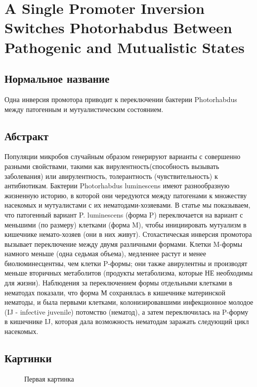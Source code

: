 \section{A Single Promoter Inversion Switches Photorhabdus Between Pathogenic and Mutualistic States}

\subsection{Нормальное название}

Одна инверсия промотора приводит к переключении бактерии Photorhabdus между патогенным и мутуалистическим состоянием.
\subsection{Абстракт}
Популяции микробов случайным образом генерируют варианты с совершенно разными свойствами, такими как вирулентность(способность вызывать заболевания) или авирулентность, толерантность (чувствительность) к антибиотикам. Бактерии Photorhabdus luminescens имеют разнообразную жизненную историю, в которой они чередуются между патогенами к множеству насекомых и мутуалистами с их нематодами-хозяевами. В статье мы показываем, что патогенный вариант P. luminescens (форма P) переключается на вариант с меньшими (по размеру) клетками (форма M), чтобы инициировать мутуализм в кишечнике немато-хозяев (они в них живут). Стохастическая инверсия промотора вызывает переключение между двумя различными формами. Клетки M-формы намного меньше (одна седьмая объема), медленнее растут и менее биолюминесцентны, чем клетки P-формы; они также авирулентны и производят меньше вторичных метаболитов (продукты метаболизма, которые НЕ необходимы для жизни). Наблюдения за переключением формы отдельными клетками в нематодах показали, что форма М сохранялась в кишечнике материнской нематоды, и была первыми клетками, колонизировавшими инфекционное молодое (IJ - infective juvenile) потомство (нематод), а затем переключилась на P-форму в кишечнике IJ, которая дала возможность нематодам заражать следующий цикл насекомых.


\subsection{Картинки}
\begin{figure}[H]\label{ul}
	\caption{Первая картинка}
\end{figure} 


